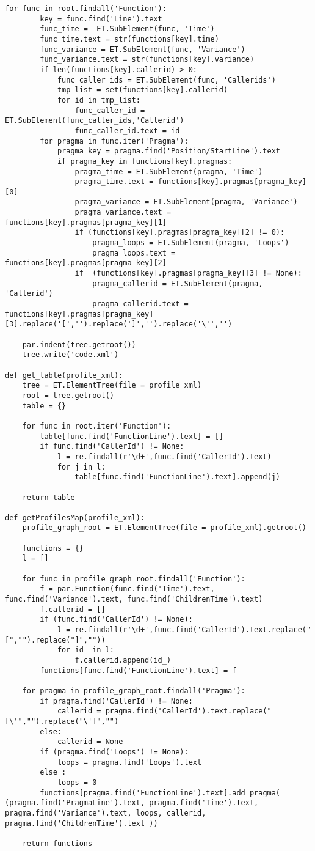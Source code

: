 \documentclass[a4paper,10pt,twoside]{book}
\begin{document}
\begin{lstlisting}[language=CCC, caption=profiler.py]
	for func in root.findall('Function'):
		key = func.find('Line').text
		func_time =  ET.SubElement(func, 'Time')
		func_time.text = str(functions[key].time)
		func_variance = ET.SubElement(func, 'Variance')
		func_variance.text = str(functions[key].variance)
		if len(functions[key].callerid) > 0:
			func_caller_ids = ET.SubElement(func, 'Callerids')
			tmp_list = set(functions[key].callerid)
			for id in tmp_list:
				func_caller_id = ET.SubElement(func_caller_ids,'Callerid')
				func_caller_id.text = id
		for pragma in func.iter('Pragma'):
			pragma_key = pragma.find('Position/StartLine').text
			if pragma_key in functions[key].pragmas:
				pragma_time = ET.SubElement(pragma, 'Time')
				pragma_time.text = functions[key].pragmas[pragma_key][0]
				pragma_variance = ET.SubElement(pragma, 'Variance')
				pragma_variance.text = functions[key].pragmas[pragma_key][1]
				if (functions[key].pragmas[pragma_key][2] != 0):
					pragma_loops = ET.SubElement(pragma, 'Loops')
					pragma_loops.text = functions[key].pragmas[pragma_key][2]	
				if 	(functions[key].pragmas[pragma_key][3] != None):
					pragma_callerid = ET.SubElement(pragma, 'Callerid')
					pragma_callerid.text = functions[key].pragmas[pragma_key][3].replace('[','').replace(']','').replace('\'','')

	par.indent(tree.getroot())			
	tree.write('code.xml')

def get_table(profile_xml):
	tree = ET.ElementTree(file = profile_xml) 
	root = tree.getroot()
	table = {}

	for func in root.iter('Function'):
		table[func.find('FunctionLine').text] = []
		if func.find('CallerId') != None:
			l = re.findall(r'\d+',func.find('CallerId').text)
			for j in l:
				table[func.find('FunctionLine').text].append(j)

	return table

def getProfilesMap(profile_xml):
	profile_graph_root = ET.ElementTree(file = profile_xml).getroot()

	functions = {}
	l = []

	for func in profile_graph_root.findall('Function'):
		f = par.Function(func.find('Time').text, func.find('Variance').text, func.find('ChildrenTime').text)
		f.callerid = []
		if (func.find('CallerId') != None):
			l = re.findall(r'\d+',func.find('CallerId').text.replace("[","").replace("]",""))
			for id_ in l:
				f.callerid.append(id_)
		functions[func.find('FunctionLine').text] = f

	for pragma in profile_graph_root.findall('Pragma'):
		if pragma.find('CallerId') != None:
			callerid = pragma.find('CallerId').text.replace("[\'","").replace("\']","")
		else:
			callerid = None
		if (pragma.find('Loops') != None):
			loops = pragma.find('Loops').text
		else :
			loops = 0
		functions[pragma.find('FunctionLine').text].add_pragma( (pragma.find('PragmaLine').text, pragma.find('Time').text, pragma.find('Variance').text, loops, callerid, pragma.find('ChildrenTime').text ))

	return functions
\end{lstlisting}
\end{document}
